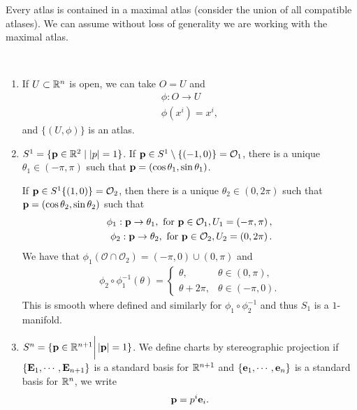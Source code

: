 Every atlas is contained in a maximal atlas (consider the union of all compatible atlases). We can assume without loss of generality we are working with the maximal atlas.

\begin{examples}~
    \begin{enumerate}[label=\roman*)]
        \item If $U \subset \mathbb{R}^{n}$ is open, we can take $O = U$ and
            \begin{align}
                \phi : O \to U \\
                \phi \left( x^{i} \right) = x^{i}
            ,\end{align}
            and $\{\left( U,\phi \right) \} $ is an atlas.
        \item $S^{1} = \{ \vb{p} \in \mathbb{R}^{2}  \mid  \left| p \right| = 1\} $.
            If $\vb{p} \in S^{1} \setminus \{ \left( -1,0 \right) \} = \mathcal{O}_1$, there is a unique $\theta_1 \in \left( -\pi, \pi \right) $ such that $\vb{p} = \left( \cos \theta_1, \sin \theta_1 \right) $.

            If $\vb{p} \in S^{1} \{\left( 1,0 \right) \} = \mathcal{O}_2$, then there is a unique $\theta_2 \in \left( 0, 2\pi \right) $ such that $\vb{p} = \left( \cos \theta_2, \sin \theta_2 \right) $ such that
            \begin{align}
                \phi_1 : \vb{p} \to \theta_1, \text{~for~} \vb{p} \in \mathcal{O}_1, U_1 = \left( -\pi, \pi \right), \\
                \phi_2 : \vb{p} \to \theta_2, \text{~for~} \vb{p} \in \mathcal{O}_2, U_2 = \left( 0,2\pi \right)
            .\end{align}
            We have that $\phi_1 \left( \mathcal{O} \cap \mathcal{O}_2 \right) = \left( -\pi,0 \right) \cup \left( 0,\pi \right) $ and 
            \begin{align}
                \phi_2 \circ \phi_1^{-1} \left( \theta \right) = \begin{cases}
                    \theta, & \theta \in \left( 0, \pi \right),\\
                    \theta + 2\pi , & \theta \in \left( -\pi,0 \right) .
                \end{cases}
            \end{align}
            This is smooth where defined and similarly for $\phi_1 \circ \phi_2^{-1}$ and thus $S_1$ is a $1$-manifold.
        \item $S^{n} = \{\vb{p} \in \mathbb{R}^{n+1}  \bigg|  \left| \vb{p} \right| = 1\} $.
            We define charts by stereographic projection if $\{\vb{E}_1, \cdots , \vb{E}_{n+1}\} $ is a standard basis for $\mathbb{R}^{n+1}$ and $\{\vb{e}_1, \cdots, \vb{e}_{n}\} $ is a standard basis for $\mathbb{R}^{n}$, we write
            \begin{align}
                \vb{p} = p^{i}\vb{e}_{i}
            .\end{align}


\end{enumerate}
\end{examples}

